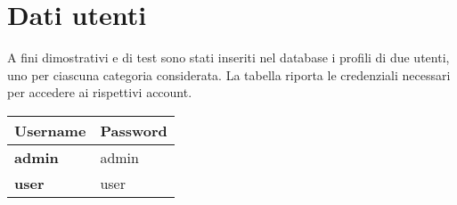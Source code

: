 \appendix
\section{Dati utenti}
\label{dati-utenti}
A fini dimostrativi e di test sono stati inseriti nel database i profili di due utenti, uno per ciascuna categoria considerata. La tabella riporta le credenziali necessari per accedere ai rispettivi account.

\begin{center}
		\begin{tabular}{ | l | l | } \hline
				\textbf{Username} 		& \textbf{Password} \\ \hline 
		 		\textbf{admin} 				& admin 	\\ 
		 		\textbf{user}					& user 	\\  \hline
		\end{tabular}
\end{center}